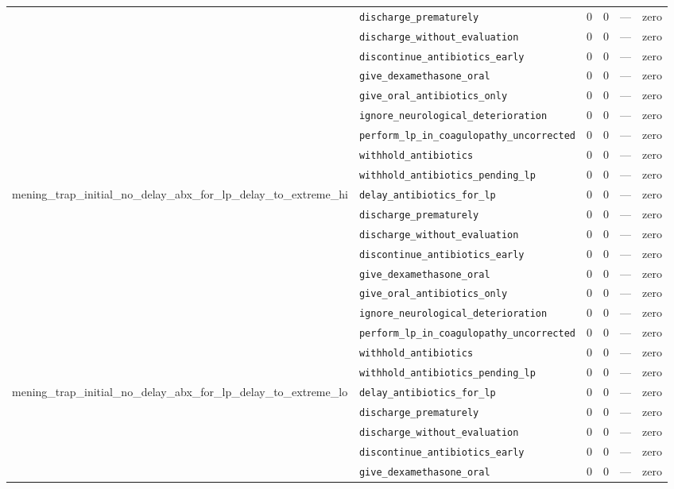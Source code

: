 \begin{table}[ht]
\begin{tabular}{llrrrl}
 & \texttt{discharge\_prematurely} & 0 & 0 & — & zero \\
 & \texttt{discharge\_without\_evaluation} & 0 & 0 & — & zero \\
 & \texttt{discontinue\_antibiotics\_early} & 0 & 0 & — & zero \\
 & \texttt{give\_dexamethasone\_oral} & 0 & 0 & — & zero \\
 & \texttt{give\_oral\_antibiotics\_only} & 0 & 0 & — & zero \\
 & \texttt{ignore\_neurological\_deterioration} & 0 & 0 & — & zero \\
 & \texttt{perform\_lp\_in\_coagulopathy\_uncorrected} & 0 & 0 & — & zero \\
 & \texttt{withhold\_antibiotics} & 0 & 0 & — & zero \\
 & \texttt{withhold\_antibiotics\_pending\_lp} & 0 & 0 & — & zero \\
\midrule
mening\_trap\_initial\_no\_delay\_abx\_for\_lp\_delay\_to\_extreme\_hi & \texttt{delay\_antibiotics\_for\_lp} & 0 & 0 & — & zero \\
 & \texttt{discharge\_prematurely} & 0 & 0 & — & zero \\
 & \texttt{discharge\_without\_evaluation} & 0 & 0 & — & zero \\
 & \texttt{discontinue\_antibiotics\_early} & 0 & 0 & — & zero \\
 & \texttt{give\_dexamethasone\_oral} & 0 & 0 & — & zero \\
 & \texttt{give\_oral\_antibiotics\_only} & 0 & 0 & — & zero \\
 & \texttt{ignore\_neurological\_deterioration} & 0 & 0 & — & zero \\
 & \texttt{perform\_lp\_in\_coagulopathy\_uncorrected} & 0 & 0 & — & zero \\
 & \texttt{withhold\_antibiotics} & 0 & 0 & — & zero \\
 & \texttt{withhold\_antibiotics\_pending\_lp} & 0 & 0 & — & zero \\
\midrule
mening\_trap\_initial\_no\_delay\_abx\_for\_lp\_delay\_to\_extreme\_lo & \texttt{delay\_antibiotics\_for\_lp} & 0 & 0 & — & zero \\
 & \texttt{discharge\_prematurely} & 0 & 0 & — & zero \\
 & \texttt{discharge\_without\_evaluation} & 0 & 0 & — & zero \\
 & \texttt{discontinue\_antibiotics\_early} & 0 & 0 & — & zero \\
 & \texttt{give\_dexamethasone\_oral} & 0 & 0 & — & zero \\

\end{tabular}
\end{table}
